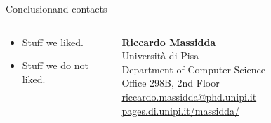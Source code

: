 \begin{frame}{Conclusion}{and contacts }
  \centering
  \begin{columns}
    \begin{column}{0.55\textwidth}
      \begin{itemize}
        \item Stuff we liked.
        \item Stuff we do not liked.
      \end{itemize}
    \end{column}
    \begin{column}{0.45\textwidth}
      \pause\textbf{Riccardo Massidda}\\
      {Università di Pisa}\\
      {Department of Computer Science}\\
      {Office 298B, 2nd Floor}\\[1em]
      \href{mailto:riccardo.massidda@phd.unipi.it}{riccardo.massidda@phd.unipi.it}
      \href{https://pages.di.unipi.it/massidda/}{pages.di.unipi.it/massidda/}
    \end{column}
  \end{columns}
\end{frame}
